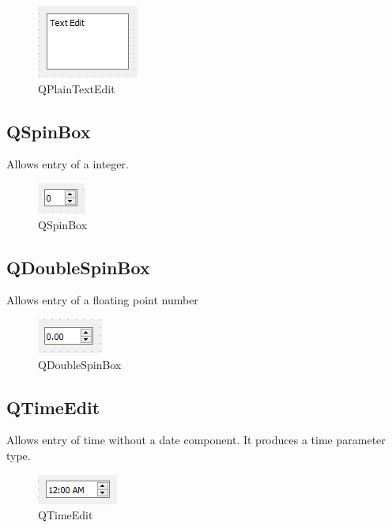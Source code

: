\documentclass[a4paper,10pt]{book}
\begin{document}
\begin {figure}[!ht]
 \centering
 \includegraphics[scale=1.0]{images/widget/qtextedit}
 \caption{QPlainTextEdit}
\end {figure}

\subsection{QSpinBox}

Allows entry of a integer.

\begin {figure}[!ht]
 \centering
 \includegraphics[scale=1.0]{images/widget/qspinbox}
 \caption{QSpinBox}
\end {figure}


\subsection{QDoubleSpinBox}
Allows entry of a floating point number

\begin {figure}[!ht]
 \centering
 \includegraphics[scale=1.0]{images/widget/qdoublespinbox}
 \caption{QDoubleSpinBox}
\end {figure}

\subsection{QTimeEdit}

Allows entry of time without a date component. It produces a time parameter type.

\begin {figure}[!ht]
 \centering
 \includegraphics[scale=1.0]{images/widget/qtimeedit}
 \caption{QTimeEdit}
\end {figure}
\end{document}

